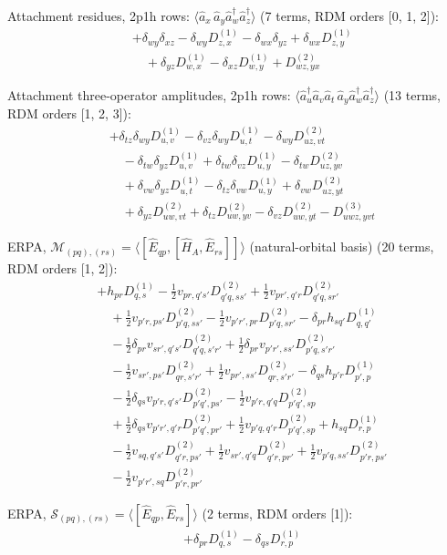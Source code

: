 \noindent Attachment residues, 2p1h rows: $\langle \hat a_x\,\hat a_y\hat a_w^\dagger \hat a_z^\dagger\rangle$ (7 terms, RDM orders [0, 1, 2]):
\begin{align*}
&+\delta_{wy}\delta_{xz}-\delta_{wy}D^{(1)}_{z,x}-\delta_{wx}\delta_{yz}+\delta_{wx}D^{(1)}_{z,y} \\
&\quad +\delta_{yz}D^{(1)}_{w,x}-\delta_{xz}D^{(1)}_{w,y}+D^{(2)}_{wz,yx}
\end{align*}

\noindent Attachment three-operator amplitudes, 2p1h rows: $\langle \hat a_u^\dagger \hat a_v\hat a_t\,\hat a_y\hat a_w^\dagger \hat a_z^\dagger\rangle$ (13 terms, RDM orders [1, 2, 3]):
\begin{align*}
&+\delta_{tz}\delta_{wy}D^{(1)}_{u,v}-\delta_{vz}\delta_{wy}D^{(1)}_{u,t}-\delta_{wy}D^{(2)}_{uz,vt} \\
&\quad -\delta_{tw}\delta_{yz}D^{(1)}_{u,v}+\delta_{tw}\delta_{vz}D^{(1)}_{u,y}-\delta_{tw}D^{(2)}_{uz,yv} \\
&\quad +\delta_{vw}\delta_{yz}D^{(1)}_{u,t}-\delta_{tz}\delta_{vw}D^{(1)}_{u,y}+\delta_{vw}D^{(2)}_{uz,yt} \\
&\quad +\delta_{yz}D^{(2)}_{uw,vt}+\delta_{tz}D^{(2)}_{uw,yv}-\delta_{vz}D^{(2)}_{uw,yt}-D^{(3)}_{uwz,yvt}
\end{align*}

\noindent ERPA, $\mathcal M_{(pq),(rs)}=\langle[\hat E_{qp},[\hat H_A,\hat E_{rs}]]\rangle$ (natural-orbital basis) (20 terms, RDM orders [1, 2]):
\begin{align*}
&+h_{pr}D^{(1)}_{q,s}-\tfrac12v_{pr,q's'}D^{(2)}_{q'q,ss'}+\tfrac12v_{pr',q'r}D^{(2)}_{q'q,sr'} \\
&\quad +\tfrac12v_{p'r,ps'}D^{(2)}_{p'q,ss'}-\tfrac12v_{p'r',pr}D^{(2)}_{p'q,sr'}-\delta_{pr}h_{sq'}D^{(1)}_{q,q'} \\
&\quad -\tfrac12\delta_{pr}v_{sr',q's'}D^{(2)}_{q'q,s'r'}+\tfrac12\delta_{pr}v_{p'r',ss'}D^{(2)}_{p'q,s'r'} \\
&\quad -\tfrac12v_{sr',ps'}D^{(2)}_{qr,s'r'}+\tfrac12v_{pr',ss'}D^{(2)}_{qr,s'r'}-\delta_{qs}h_{p'r}D^{(1)}_{p',p} \\
&\quad -\tfrac12\delta_{qs}v_{p'r,q's'}D^{(2)}_{p'q',ps'}-\tfrac12v_{p'r,q'q}D^{(2)}_{p'q',sp} \\
&\quad +\tfrac12\delta_{qs}v_{p'r',q'r}D^{(2)}_{p'q',pr'}+\tfrac12v_{p'q,q'r}D^{(2)}_{p'q',sp}+h_{sq}D^{(1)}_{r,p} \\
&\quad -\tfrac12v_{sq,q's'}D^{(2)}_{q'r,ps'}+\tfrac12v_{sr',q'q}D^{(2)}_{q'r,pr'}+\tfrac12v_{p'q,ss'}D^{(2)}_{p'r,ps'} \\
&\quad -\tfrac12v_{p'r',sq}D^{(2)}_{p'r,pr'}
\end{align*}

\noindent ERPA, $\mathcal S_{(pq),(rs)}=\langle[\hat E_{qp},\hat E_{rs}]\rangle$ (2 terms, RDM orders [1]):
\begin{align*}
&+\delta_{pr}D^{(1)}_{q,s}-\delta_{qs}D^{(1)}_{r,p}
\end{align*}

